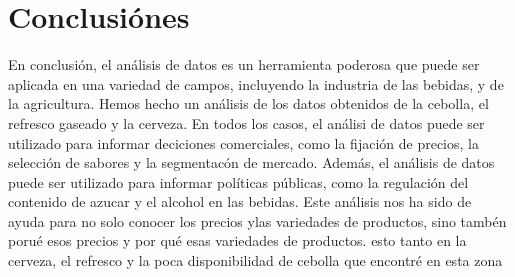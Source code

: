 \documentclass[]{article}
\begin{document}
\section{Conclusiónes}
En conclusión, el análisis de datos es un herramienta poderosa que puede ser aplicada en una variedad de campos, incluyendo la industria de las bebidas, y de la agricultura. Hemos hecho un análisis de los datos obtenidos de la cebolla, el refresco gaseado y la cerveza. En todos los casos, el análisi de datos puede ser utilizado para informar deciciones comerciales, como la fijación de precios, la selección de sabores y la segmentacón de mercado. Además, el análisis de datos puede ser utilizado para informar políticas públicas, como la regulación del contenido de azucar y el alcohol en las bebidas. Este análisis nos ha sido de ayuda para no solo conocer los precios ylas variedades de productos, sino tambén porué esos precios y por qué esas variedades de productos. esto tanto en la cerveza, el refresco y la poca disponibilidad de cebolla que encontré en esta zona 
\end{document}
